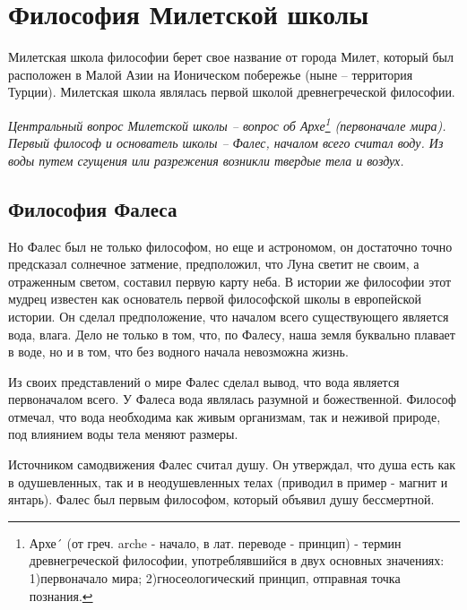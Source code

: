 \documentclass[
]{article}
\begin{document}
\hypertarget{ux444ux438ux43bux43eux441ux43eux444ux438ux44f-ux43cux438ux43bux435ux442ux441ux43aux43eux439-ux448ux43aux43eux43bux44b}{%
\section{Философия Милетской
школы}\label{ux444ux438ux43bux43eux441ux43eux444ux438ux44f-ux43cux438ux43bux435ux442ux441ux43aux43eux439-ux448ux43aux43eux43bux44b}}

Милетская школа философии берет свое название от города Милет, который
был расположен в Малой Азии на Ионическом побережье (ныне -- территория
Турции). Милетская школа являлась первой школой древнегреческой
философии.

\emph{Центральный вопрос Милетской школы -- вопрос об Архе\footnote{Архе´
  (от греч. arche - начало, в лат. переводе - принцип) - термин
  древнегреческой философии, употреблявшийся в двух основных значениях:
  1)первоначало мира; 2)гносеологический принцип, отправная точка
  познания.} (первоначале мира). Первый философ и основатель школы --
Фалес, началом всего считал воду. Из воды путем сгущения или разрежения
возникли твердые тела и воздух.}

\hypertarget{ux444ux438ux43bux43eux441ux43eux444ux438ux44f-ux444ux430ux43bux435ux441ux430}{%
\subsection{Философия
Фалеса}\label{ux444ux438ux43bux43eux441ux43eux444ux438ux44f-ux444ux430ux43bux435ux441ux430}}

Но Фалес был не только философом, но еще и астрономом, он достаточно
точно пред­сказал солнечное затмение, предположил, что Луна светит не
своим, а отраженным светом, составил первую карту неба. В ис­тории же
философии этот мудрец известен как основатель пер­вой философской школы
в европейской истории. Он сделал предположение, что началом всего
существующего является вода, влага. Дело не только в том, что, по
Фалесу, наша земля буквально плавает в воде, но и в том, что без водного
начала невозможна жизнь.

Из своих представлений о мире Фалес сделал вывод, что вода является
первоначалом всего. У Фалеса вода являлась разумной и божественной.
Философ отмечал, что вода необходима как живым организмам, так и неживой
природе, под влиянием воды тела меняют размеры.

Источником самодвижения Фалес считал душу. Он утверждал, что душа есть
как в одушевленных, так и в неодушевленных телах (приводил в пример -
магнит и янтарь). Фалес был первым философом, который объявил душу
бессмертной.
\end{document}
